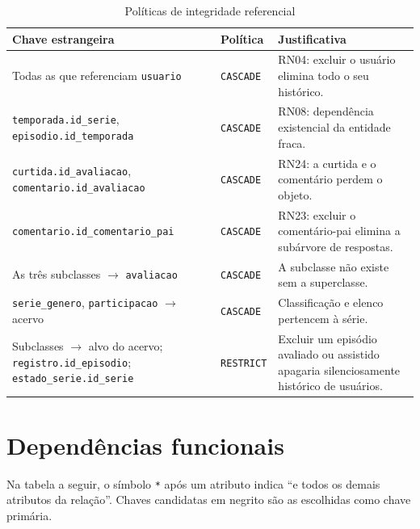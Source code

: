 \documentclass[a4paper,12pt,oneside,openany]{book}
\newif\iforientacoes
\newcommand{\orientacao}[1]{%
    \iforientacoes
        \begin{quote}
        \small\itshape\textbf{Orientação:} #1
        \end{quote}
    \fi
}
\newcommand{\id}[1]{\texttt{#1}}
\begin{document}
\begin{table}[H]
\centering
\caption{Políticas de integridade referencial}
\label{tab:politicas}
\small
\begin{tabularx}{\textwidth}{@{}p{5.6cm}p{2.4cm}X@{}}
\toprule
\textbf{Chave estrangeira} & \textbf{Política} & \textbf{Justificativa} \\
\midrule
Todas as que referenciam \id{usuario} & \id{CASCADE} & RN04: excluir o usuário
elimina todo o seu histórico. \\
\id{temporada.id\_serie}, \id{episodio.id\_temporada} & \id{CASCADE} & RN08:
dependência existencial da entidade fraca. \\
\id{curtida.id\_avaliacao}, \id{comentario.id\_avaliacao} & \id{CASCADE} & RN24: a
curtida e o comentário perdem o objeto. \\
\id{comentario.id\_comentario\_pai} & \id{CASCADE} & RN23: excluir o comentário-pai
elimina a subárvore de respostas. \\
As três subclasses $\rightarrow$ \id{avaliacao} & \id{CASCADE} & A subclasse não
existe sem a superclasse. \\
\id{serie\_genero}, \id{participacao} $\rightarrow$ acervo & \id{CASCADE} &
Classificação e elenco pertencem à série. \\
Subclasses $\rightarrow$ alvo do acervo; \id{registro.id\_episodio};
\id{estado\_serie.id\_serie} & \id{RESTRICT} & Excluir um episódio avaliado ou
assistido apagaria silenciosamente histórico de usuários. \\
\bottomrule
\end{tabularx}
\end{table}

\section{Dependências funcionais}\label{sec:dependencias}

\orientacao{Para cada relação, listem as dependências funcionais na forma
$X \rightarrow Y$ e identifiquem as chaves candidatas. Esta seção é o insumo da
seção seguinte: sem as dependências explícitas, a demonstração de normalização
fica sem base. A tabela abaixo já traz as relações; preencham as duas colunas
restantes. Atenção especial às relações de chave composta -- \id{participacao},
\id{estado\_serie}, \id{serie\_genero}, \id{segue} e \id{curtida} -- que são onde
uma violação de 2FN apareceria, caso existisse.}

Na tabela a seguir, o símbolo \id{*} após um atributo indica ``e todos os demais
atributos da relação''. Chaves candidatas em negrito são as escolhidas como chave
primária.
\end{document}
